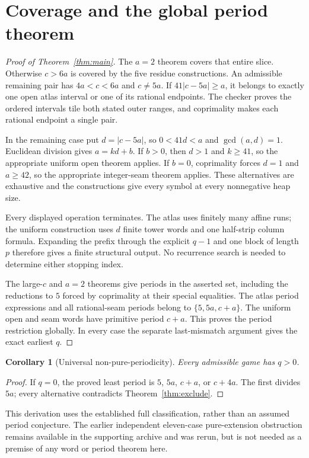 \documentclass[11pt]{article}
\newtheorem{corollary}[theorem]{Corollary}
\theoremstyle{remark}\newtheorem{remark}[theorem]{Remark}
\begin{document}
\section{Coverage and the global period theorem}\label{sec:coverage}
\begin{proof}[Proof of Theorem~\ref{thm:main}]
The $a=2$ theorem covers that entire slice. Otherwise $c>6a$ is covered by the five residue constructions. An admissible remaining pair has $4a<c<6a$ and $c\ne5a$. If $41|c-5a|\ge a$, it belongs to exactly one open atlas interval or one of its rational endpoints. The checker proves the ordered intervals tile both stated outer ranges, and coprimality makes each rational endpoint a single pair.

In the remaining case put $d=|c-5a|$, so $0<41d<a$ and $\gcd(a,d)=1$. Euclidean division gives $a=kd+b$. If $b>0$, then $d>1$ and $k\ge41$, so the appropriate uniform open theorem applies. If $b=0$, coprimality forces $d=1$ and $a\ge42$, so the appropriate integer-seam theorem applies. These alternatives are exhaustive and the constructions give every symbol at every nonnegative heap size.

Every displayed operation terminates. The atlas uses finitely many affine runs; the uniform construction uses $d$ finite tower words and one half-strip column formula. Expanding the prefix through the explicit $q-1$ and one block of length $p$ therefore gives a finite structural output. No recurrence search is needed to determine either stopping index.

The large-$c$ and $a=2$ theorems give periods in the asserted set, including the reductions to $5$ forced by coprimality at their special equalities. The atlas period expressions and all rational-seam periods belong to $\{5,5a,c+a\}$. The uniform open and seam words have primitive period $c+a$. This proves the period restriction globally. In every case the separate last-mismatch argument gives the exact earliest $q$.
\end{proof}

\begin{corollary}[Universal non-pure-periodicity]\label{thm:nonpure}
Every admissible game has $q>0$.
\end{corollary}
\begin{proof}
If $q=0$, the proved least period is $5$, $5a$, $c+a$, or $c+4a$.
The first divides $5a$; every alternative contradicts Theorem~\ref{thm:exclude}.
\end{proof}
This derivation uses the established full classification, rather than an assumed period conjecture. The earlier independent eleven-case pure-extension obstruction remains available in the supporting archive and was rerun, but is not needed as a premise of any word or period theorem here.
\end{document}
